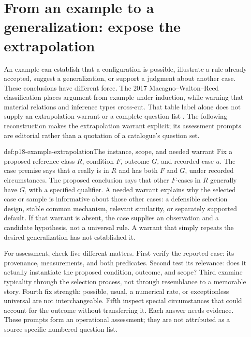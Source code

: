 \section{From an example to a generalization: expose the extrapolation}
\label{sec:p18-example-sign-schemes}

An example can establish that a configuration is possible, illustrate a rule
already accepted, suggest a generalization, or support a judgment about another
case. These conclusions have different force. The 2017 Macagno--Walton--Reed
classification places argument from example under induction, while warning
that material relations and inference types cross-cut. That table label alone
does not supply an extrapolation warrant or a complete question list
\parencite[pp.~2495--2496, 2518--2519]{MacagnoWaltonReed2017Schemes}.
The following reconstruction makes the extrapolation warrant explicit;
its assessment prompts are editorial rather than a quotation of a
catalogue's question set.

\begin{hbdefinition}{def:p18-example-extrapolation}{The instance, scope, and needed warrant}
Fix a proposed reference class \(R\), condition \(F\), outcome \(G\), and
recorded case \(a\). The case premise says that \(a\) really is in \(R\)
and has both \(F\) and \(G\), under recorded circumstances. The proposed
conclusion says that other \(F\)-cases in \(R\) generally have \(G\), with
a specified qualifier. A needed warrant explains why the selected case or
sample is informative about those other cases: a defensible selection design,
stable common mechanism, relevant similarity, or separately supported default.
If that warrant is absent, the case supplies an observation and a candidate
hypothesis, not a universal rule. A warrant that simply repeats the desired
generalization has not established it.
\end{hbdefinition}

For assessment, check five different matters. First verify the reported case:
its provenance, measurements, and both predicates. Second test its relevance:
does it actually instantiate the proposed condition, outcome, and scope?
Third examine typicality through the selection process, not through resemblance
to a memorable story. Fourth fix strength: possible, usual, a numerical rate,
or exceptionless universal are not interchangeable. Fifth inspect special
circumstances that could account for the outcome without transferring it.
Each answer needs evidence. These prompts form an operational assessment;
they are not attributed as a source-specific numbered question list.

